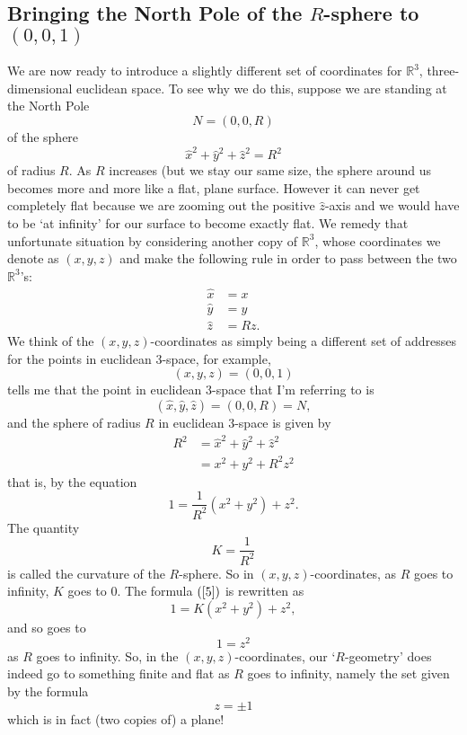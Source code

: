 
\subsection*{Bringing the North Pole of the $R$-sphere to $\left(
0,0,1\right)  $}

We are now ready to introduce a slightly different set of coordinates for
$\mathbb{R}^{3}$, three-dimensional euclidean space. To see why we do this,
suppose we are standing at the North Pole%
\[
N=\left(  0,0,R\right)
\]
of the sphere%
\begin{equation}
\hat{x}^{2}+\hat{y}^{2}+\hat{z}^{2}=R^{2} \label{4}%
\end{equation}
of radius $R$. As $R$ increases (but we stay our same size, the sphere around
us becomes more and more like a flat, plane surface. However it can never get
completely flat because we are zooming out the positive $\hat{z}$-axis and we
would have to be `at infinity' for our surface to become exactly flat. We
remedy that unfortunate situation by considering another copy of
$\mathbb{R}^{3}$, whose coordinates we denote as $\left(  x,y,z\right)  $ and
make the following rule in order to pass between the two $\mathbb{R}^{3}$'s:%
\begin{align}
\hat{x}  &  =x\label{105}\\
\hat{y}  &  =y\nonumber\\
\hat{z}  &  =Rz.\nonumber
\end{align}
We think of the $\left(  x,y,z\right)  $-coordinates as simply being a
different set of addresses for the points in euclidean $3$-space, for example,%
\[
\left(  x,y,z\right)  =\left(  0,0,1\right)
\]
tells me that the point in euclidean $3$-space that I'm referring to is%
\[
\left(  \hat{x},\hat{y},\hat{z}\right)  =\left(  0,0,R\right)  =N,
\]
and the sphere of radius $R$ in euclidean $3$-space is given by%
\begin{align*}
R^{2}  &  =\hat{x}^{2}+\hat{y}^{2}+\hat{z}^{2}\\
&  =x^{2}+y^{2}+R^{2}z^{2}%
\end{align*}
that is, by the equation%
\begin{equation}
1=\frac{1}{R^{2}}\left(  x^{2}+y^{2}\right)  +z^{2}. \label{5}%
\end{equation}
The quantity%
\[
K=\frac{1}{R^{2}}%
\]
is called the curvature of the $R$-sphere. So in $\left(  x,y,z\right)
$-coordinates, as $R$ goes to infinity, $K$ goes to $0$. The formula $\left(
\ref{5}\right)  $ is rewritten as%
\begin{equation}
1=K\left(  x^{2}+y^{2}\right)  +z^{2}, \label{7}%
\end{equation}
and so goes to%
\[
1=z^{2}%
\]
as $R$ goes to infinity. So, in the $\left(  x,y,z\right)  $-coordinates, our
`$R$-geometry' does indeed go to something finite and flat as $R$ goes to
infinity, namely the set given by the formula%
\[
z=\pm1
\]
which is in fact (two copies of) a plane!

